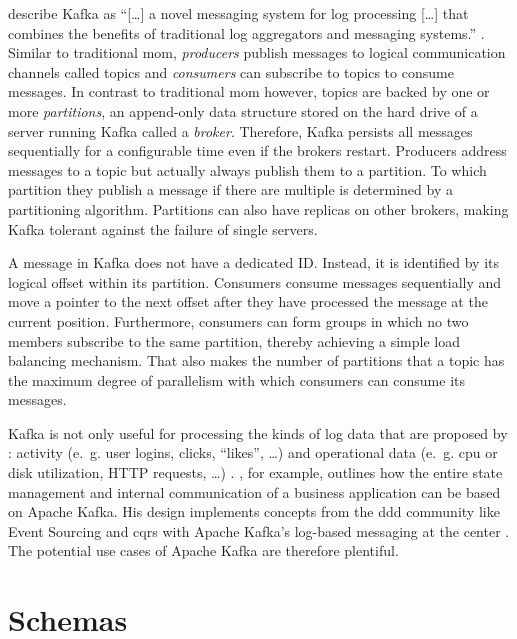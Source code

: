 \citeauthor{kreps_kafka_2011} describe Kafka as \enquote{[\ldots] a novel messaging system for log processing [\ldots] that combines the benefits of traditional log aggregators and messaging systems.} \parencite{kreps_kafka_2011}.
Similar to traditional \gls{mom}, \emph{producers} publish messages to logical communication channels called topics and \emph{consumers} can subscribe to topics to consume messages.
In contrast to traditional \gls{mom} however, topics are backed by one or more \emph{partitions}, an append-only data structure stored on the hard drive of a server running Kafka called a \emph{broker}.
Therefore, Kafka persists all messages sequentially for a configurable time even if the brokers restart.
Producers address messages to a topic but actually always publish them to a partition.
To which partition they publish a message if there are multiple is determined by a partitioning algorithm.
Partitions can also have replicas on other brokers, making Kafka tolerant against the failure of single servers.
\parencite{kreps_kafka_2011}

A message in Kafka does not have a dedicated ID.
Instead, it is identified by its logical offset within its partition.
Consumers consume messages sequentially and move a pointer to the next offset after they have processed the message at the current position.
Furthermore, consumers can form groups in which no two members subscribe to the same partition, thereby achieving a simple load balancing mechanism.
That also makes the number of partitions that a topic has the maximum degree of parallelism with which consumers can consume its messages.
\parencite{kreps_kafka_2011}

Kafka is not only useful for processing the kinds of log data that are proposed by \citeauthor{kreps_kafka_2011}: activity (e.~g. user logins, clicks, \enquote{likes}, \ldots) and operational data (e.~g. \gls{cpu} or disk utilization, HTTP requests, \ldots) \parencite{kreps_kafka_2011}.
\citeauthor{stopford_designing_2018}, for example, outlines how the entire state management and internal communication of a business application can be based on Apache Kafka.
His design implements concepts from the \gls{ddd} community like Event Sourcing \parencite{fowler_event_sourcing_2005} and \gls{cqrs} \parencite{fowler_cqrs_2011} with Apache Kafka's log-based messaging at the center \parencite{stopford_designing_2018}.
The potential use cases of Apache Kafka are therefore plentiful.

\section{Schemas}

